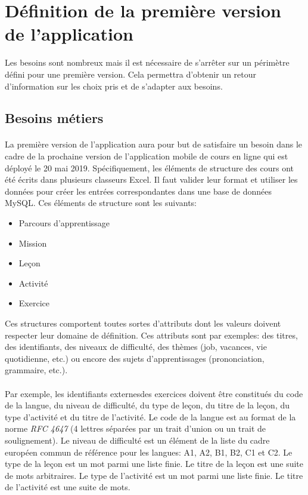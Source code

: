 \section{Définition de la première version de l'application}
\label{sec:first-version-definition}

Les besoins sont nombreux mais il est nécessaire de s'arrêter sur un périmètre défini pour une première version.
Cela permettra d'obtenir un retour d'information sur les choix pris et de s'adapter aux besoins.

\subsection{Besoins métiers}
\label{subsec:business-needs}

\paragraph{}
La première version de l'application aura pour but de satisfaire un besoin dans le cadre de la prochaine version de l'application mobile de cours en ligne qui est déployé le 20 mai 2019.
Spécifiquement, les éléments de structure des cours ont été écrits dans plusieurs classeurs Excel.
Il faut valider leur format et utiliser les données pour créer les entrées correspondantes dans une base de données MySQL.
Ces éléments de structure sont les suivants:
\begin{itemize}
    \item Parcours d'apprentissage
    \item Mission
    \item Leçon
    \item Activité
    \item Exercice
\end{itemize}

Ces structures comportent toutes sortes d'attributs dont les valeurs doivent respecter leur domaine de définition.
Ces attributs sont par exemples: des titres, des identifiants, des niveaux de difficulté, des thèmes (job, vacances, vie quotidienne, etc.) ou encore des sujets d'apprentissages (prononciation, grammaire, etc.).

\paragraph{}
Par exemple, les identifiants externes\fnmark des exercices doivent être constitués du code de la langue, du niveau de difficulté, du type de leçon, du titre de la leçon, du type d'activité et du titre de l'activité.
Le code de la langue est au format de la norme \textit{RFC 4647}\cite{davis_matching_nodate} (4 lettres séparées par un trait d'union ou un trait de soulignement).
Le niveau de difficulté est un élément de la liste du cadre européen commun de référence pour les langues\cite{noauthor_cadre_nodate}: A1, A2, B1, B2, C1 et C2.
Le type de la leçon est un mot parmi une liste finie.
Le titre de la leçon est une suite de mots arbitraires.
Le type de l'activité est un mot parmi une liste finie.
Le titre de l'activité est une suite de mots.

